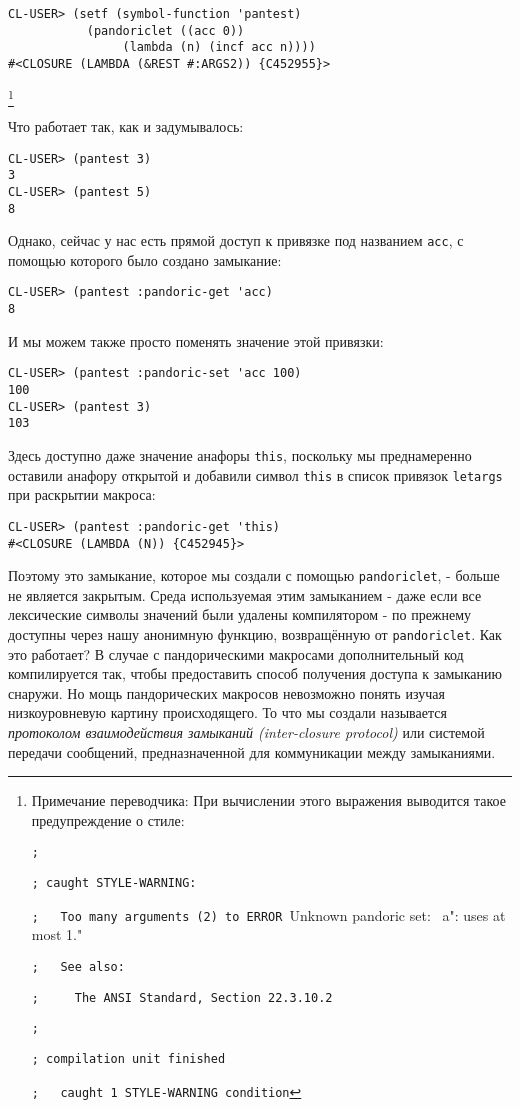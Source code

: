 \begin{verbatim}
CL-USER> (setf (symbol-function 'pantest)
	       (pandoriclet ((acc 0))
			    (lambda (n) (incf acc n))))
#<CLOSURE (LAMBDA (&REST #:ARGS2)) {C452955}>
\end{verbatim}
\footnote{Примечание переводчика: При вычислении этого выражения выводится такое предупреждение о стиле:

\verb"; "

\verb"; caught STYLE-WARNING:"

\verb";   Too many arguments (2) to ERROR "Unknown pandoric set: ~a": uses at most 1."

\verb";   See also:"

\verb";     The ANSI Standard, Section 22.3.10.2"

\verb"; "

\verb"; compilation unit finished"

\verb";   caught 1 STYLE-WARNING condition"


}

Что работает так, как и задумывалось:

\begin{verbatim}
CL-USER> (pantest 3)
3
CL-USER> (pantest 5)
8
\end{verbatim}

Однако, сейчас у нас есть прямой доступ к привязке под названием \verb"acc", с помощью которого было создано замыкание:

\begin{verbatim}
CL-USER> (pantest :pandoric-get 'acc)
8
\end{verbatim}

И мы можем также просто поменять значение этой привязки:

\begin{verbatim}
CL-USER> (pantest :pandoric-set 'acc 100)
100
CL-USER> (pantest 3)
103
\end{verbatim}

Здесь доступно даже значение анафоры \verb"this", поскольку мы преднамеренно оставили анафору открытой и добавили символ \verb"this" в список привязок \verb"letargs" при раскрытии макроса:

\begin{verbatim}
CL-USER> (pantest :pandoric-get 'this)
#<CLOSURE (LAMBDA (N)) {C452945}>
\end{verbatim}

Поэтому это замыкание, которое мы создали с помощью \verb"pandoriclet", - больше не является закрытым. Среда используемая этим замыканием - даже если все лексические символы значений были удалены компилятором - по прежнему доступны через нашу анонимную функцию, возвращённую от \verb"pandoriclet". Как это работает? В случае с пандорическими макросами дополнительный код компилируется так, чтобы предоставить способ получения доступа к замыканию снаружи. Но мощь пандорических макросов невозможно понять изучая низкоуровневую картину происходящего. То что мы создали называется \emph{протоколом взаимодействия замыканий (inter-closure protocol)} или системой передачи сообщений, предназначенной для коммуникации между замыканиями.

